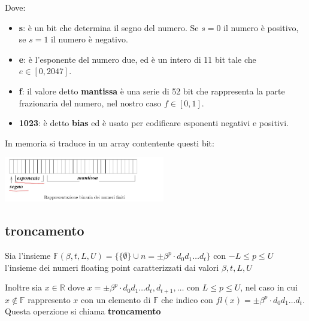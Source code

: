 Dove: 
\begin{itemize}
    \item \textbf{s}: è un bit che determina il segno del numero. Se $s=0$ il numero è positivo, se $s=1$ il numero è negativo.
    \item \textbf{e}: è l'esponente del numero due, ed è un intero di 11 bit tale che $e \in [0,2047]$.
    \item \textbf{f}: il valore detto \textbf{mantissa} è una serie di 52 bit che rappresenta la parte frazionaria del numero, nel nostro caso $f \in [0,1]$.
    \item \textbf{1023}: è detto \textbf{bias} ed è usato per codificare esponenti negativi e positivi.
\end{itemize}
In memoria si traduce in un array contentente questi bit:
\begin{center}
    \includegraphics[width=7cm]{./img/floating_point_in_memoria.png}
\end{center}


\subsection{troncamento}

Sia l'insieme $\mathbb{F}(\beta, t, L, U) =\{ \{\emptyset\} \cup n = \pm \beta^p \cdot d_0 d_1 \dots d_t  \} $ con $-L \leq p \leq U$ l'insieme dei numeri floating point caratterizzati dai valori $\beta, t, L, U$

Inoltre sia $x \in \mathbb{R}$ dove $x = \pm \beta^p \cdot d_0 d_1 \dots d_t, d_{t+1}, \dots$ con $L\leq p \leq U$, nel caso in cui $x \notin \mathbb{F} $ rappresento $x$ con un elemento di $\mathbb{F} $ che indico con $fl(x) = \pm \beta^p \cdot d_0 d_1 \dots d_t$. Questa operzione si chiama \textbf{troncamento}

